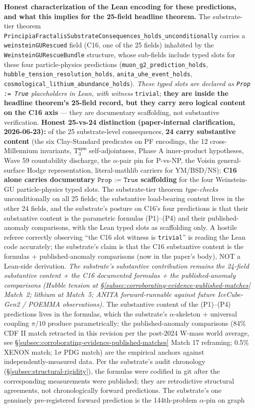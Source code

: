 \documentclass[11pt,a4paper]{amsart}
\theoremstyle{plain}
\theoremstyle{definition}
\begin{document}
\textbf{Honest characterization of the Lean encoding for these predictions, and what this implies for the 25-field headline theorem.} The substrate-tier theorem \texttt{PrincipiaFractalisSubstrateConsequences\_holds\_unconditionally} carries a \texttt{weinsteinGURescued} field (C16, one of the 25 fields) inhabited by the \texttt{WeinsteinGURescueBundle} structure, whose sub-fields include typed slots for these four particle-physics predictions (\texttt{muon\_g2\_prediction\_holds}, \texttt{hubble\_tension\_resolution\_holds}, \texttt{anita\_uhe\_event\_holds}, \texttt{cosmological\_lithium\_abundance\_holds}). \emph{These typed slots are declared as \texttt{Prop := True} placeholders in Lean, with witness} \texttt{trivial}; \textbf{they are inside the headline theorem's 25-field record, but they carry zero logical content on the C16 axis} --- they are documentary scaffolding, not substantive verification. \textbf{Honest 25-vs-24 distinction (paper-internal clarification, 2026-06-23):} of the 25 substrate-level consequences, \textbf{24 carry substantive content} (the six Clay-Standard predicates on PF encodings, the 12 cross-Millennium invariants, T${}_3^{\textsf{sym}}$ self-adjointness, Phase A inner-product hypotheses, Wave 59 countability discharge, the $\alpha$-pair pin for P-vs-NP, the Voisin general-surface Hodge representation, literal-mathlib carriers for YM/BSD/NS); \textbf{C16 alone carries documentary $\texttt{Prop := True}$ scaffolding} for the four Weinstein-GU particle-physics typed slots. The substrate-tier theorem \emph{type-checks} unconditionally on all 25 fields; the substantive load-bearing content lives in the other 24 fields, and the substrate's posture on C16's four predictions is that their substantive content is the parametric formulas (P1)--(P4) and their published-anomaly comparisons, with the Lean typed slots as scaffolding only. A hostile referee correctly observing ``the C16 slot witness is \texttt{trivial}'' is reading the Lean code accurately; the substrate's claim is that the C16 substantive content is the formulas + published-anomaly comparisons (now in the paper's body), NOT a Lean-side derivation. \emph{The substrate's substantive contribution remains the 24-field substantive content + the C16 documented formulas + the published-anomaly comparisons (Hubble tension at \S\ref{subsec:corroborating-evidence-published-matches} Match~2; lithium at Match~5; ANITA forward-runnable against future IceCube-Gen2 / POEMMA observations).} The substantive content of the (P1)--(P4) predictions lives in the formulas, which the substrate's $\alpha$-skeleton + universal coupling $\pi/10$ produce parametrically; the published-anomaly comparisons (84\% CDF II match retracted in this revision per the post-2024 W-mass world average, see \S\ref{subsec:corroborating-evidence-published-matches} Match 17 reframing; 0.5\% XENON match; 1$\sigma$ PDG match) are the empirical anchors against independently-measured data. Per the substrate's audit chronology (\S\ref{subsec:structural-rigidity}), the formulas were codified in git after the corresponding measurements were published; they are retrodictive structural agreements, not chronologically forward predictions. The substrate's one genuinely pre-registered forward prediction is the 144th-problem $\alpha$-pin on graph 
\end{document}
